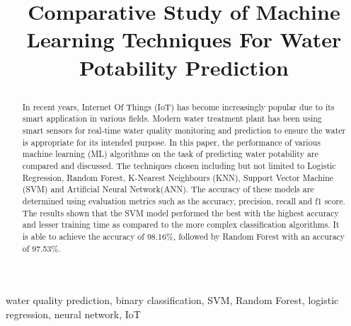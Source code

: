 \documentclass[conference]{IEEEtran}
\begin{document}
\title{
    Comparative Study of Machine Learning Techniques For Water Potability Prediction

}

\author{
}
\maketitle

\begin{abstract}
In recent years, Internet Of Things (IoT) has become increasingly popular due to its smart application in various fields. Modern water treatment plant has been using smart sensors for real-time water quality monitoring and prediction to ensure the water is appropriate for its intended purpose. In this paper, the performance of various machine learning (ML) algorithms on the task of predicting water potability are compared and discussed. The techniques chosen including but not limited to Logistic Regression, Random Forest, K-Nearest Neighbours (KNN), Support Vector Machine (SVM) and Artificial Neural Network(ANN). The accuracy of these models are determined using evaluation metrics such as the accuracy, precision, recall and f1 score. The results shown that the SVM model performed the best with the highest accuracy and lesser training time as compared to the more complex classification algorithms. It is able to achieve the accuracy of 98.16\%, followed by Random Forest with an accuracy of 97.53\%.
\end{abstract}


\begin{IEEEkeywords}
water quality prediction, binary classification, SVM, Random Forest, logistic regression, neural network, IoT
\end{IEEEkeywords}

\end{document}
